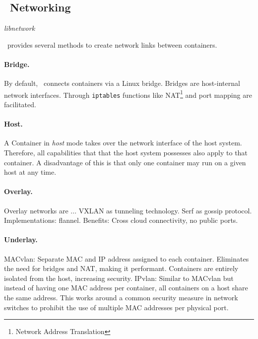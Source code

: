 \subsection{\docker\ Networking}



\emph{libnetwork}

\docker\ provides several methods to create network links between containers.  



\paragraph{Bridge.} By default, \docker\ connects containers via a Linux bridge. Bridges are host-internal network interfaces. Through \texttt{iptables} functions like NAT\footnote{Network Address Translation} and port mapping are facilitated.

\paragraph{Host.} A Container in \emph{host} mode takes over the network interface of the host system. Therefore, all capabilities that that the host system possesses also apply to that container. A disadvantage of this is that only one container may run on a given host at any time.

\paragraph{Overlay.} 
Overlay networks \cite{tarkoma2010overlay} are ...
VXLAN as tunneling technology.
Serf as gossip protocol.
Implementations: flannel.
Benefits: Cross cloud connectivity, no public ports.

\paragraph{Underlay.}
MACvlan: Separate MAC and IP address assigned to each container. Eliminates the need for bridges and NAT, making it performant. Containers are entirely isolated from the host, increasing security.
IPvlan: Similar to MACvlan but instead of having one MAC address per container, all containers on a host share the same address. This works around a common security measure in network switches to prohibit the use of multiple MAC addresses per physical port.
